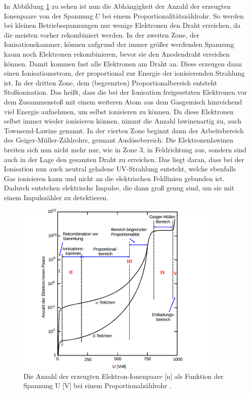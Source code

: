 \documentclass[
  bibliography=totoc,     %
  captions=tableheading,  %
  titlepage=firstiscover, %
]{scrartcl}
\begin{document}
In Abbildung \ref{fig:V7032} zu sehen ist nun die Abhängigkeit der Anzahl der
erzeugten Ionenpaare von der Spannung $U$ bei einem Proportionalitätszählrohr.
So werden bei kleinen Betriebsspannungen nur wenige Elektronen den Draht
erreichen, da die meisten vorher rekombiniert werden. In der zweiten Zone, der
Ionisationskammer, können aufgrund der immer größer werdenden Spannung kaum noch
Elektronen rekombinieren, bevor sie den Anodendraht erreichen können. Damit
kommen fast alle Elektronen am Draht an. Diese erzeugen dann einen
Ionisationsstrom, der proportional zur Energie der ionisierenden Strahlung ist.
In der dritten Zone, dem (begrenzten) Proportionalbereich entsteht Stoßionisation.
Das heißt, dass die bei der Ionisation freigesetzten Elektronen vor dem Zusammenstoß
mit einem weiteren Atom aus dem Gasgemisch hinreichend viel Energie aufnehmen, um
selbst ionisieren zu können. Da diese Elektronen selbst immer wieder ionisieren
können, nimmt die Anzahl lawinenartig zu, auch Townsend-Lawine genannt.
In der vierten Zone beginnt dann der Arbeitsbereich des Geiger-Müller-Zählrohrs,
gennant Auslösebereich. Die Elektronenlawinen breiten sich nun nicht mehr nur,
wie in Zone 3, in Feldrichtung aus, sondern sind auch in der Lage den gesamten Draht
zu erreichen. Das liegt daran, dass bei der Ionisation nun auch neutral geladene
UV-Strahlung entsteht, welche ebenfalls Gas ionisieren kann und nicht an die elektrischen
Feldlinien gebunden ist. Dadurch entstehen elektrische Impulse, die dann groß genug
sind, um sie mit einem Impulszähler zu detektieren.
\begin{figure}[htb]
  \centering
  \includegraphics[width=0.9\textwidth]{V7032.png}
  \caption{Die Anzahl der erzeugten Elektron-Ionenpaare [n] als Funktion der
  Spannung U [V] bei einem Proportionalzählrohr \cite{anleitung}.}
  \label{fig:V7032}
\end{figure}
\end{document}
